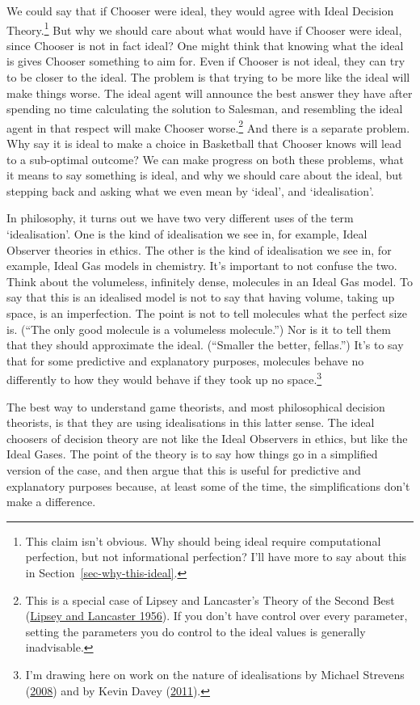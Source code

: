 \documentclass[
  12pt,
  letterpaper,
  DIV=11,
  numbers=noendperiod]{scrreprt}
\begin{document}
We could say that if Chooser were ideal, they would agree with Ideal
Decision Theory.\footnote{This claim isn't obvious. Why should being
  ideal require computational perfection, but not informational
  perfection? I'll have more to say about this in
  Section~\ref{sec-why-this-ideal}.} But why we should care about what
would have if Chooser were ideal, since Chooser is not in fact ideal?
One might think that knowing what the ideal is gives Chooser something
to aim for. Even if Chooser is not ideal, they can try to be closer to
the ideal. The problem is that trying to be more like the ideal will
make things worse. The ideal agent will announce the best answer they
have after spending no time calculating the solution to Salesman, and
resembling the ideal agent in that respect will make Chooser
worse.\footnote{This is a special case of Lipsey and Lancaster's Theory
  of the Second Best (\protect\hyperlink{ref-LipseyLancaster}{Lipsey and
  Lancaster 1956}). If you don't have control over every parameter,
  setting the parameters you do control to the ideal values is generally
  inadvisable.} And there is a separate problem. Why say it is ideal to
make a choice in Basketball that Chooser knows will lead to a
sub-optimal outcome? We can make progress on both these problems, what
it means to say something is ideal, and why we should care about the
ideal, but stepping back and asking what we even mean by `ideal', and
`idealisation'.

In philosophy, it turns out we have two very different uses of the term
`idealisation'. One is the kind of idealisation we see in, for example,
Ideal Observer theories in ethics. The other is the kind of idealisation
we see in, for example, Ideal Gas models in chemistry. It's important to
not confuse the two. Think about the volumeless, infinitely dense,
molecules in an Ideal Gas model. To say that this is an idealised model
is not to say that having volume, taking up space, is an imperfection.
The point is not to tell molecules what the perfect size is. (``The only
good molecule is a volumeless molecule.'') Nor is it to tell them that
they should approximate the ideal. (``Smaller the better, fellas.'')
It's to say that for some predictive and explanatory purposes, molecules
behave no differently to how they would behave if they took up no
space.\footnote{I'm drawing here on work on the nature of idealisations
  by Michael Strevens (\protect\hyperlink{ref-Strevens2008}{2008}) and
  by Kevin Davey (\protect\hyperlink{ref-Davey2011}{2011}).}

The best way to understand game theorists, and most philosophical
decision theorists, is that they are using idealisations in this latter
sense. The ideal choosers of decision theory are not like the Ideal
Observers in ethics, but like the Ideal Gases. The point of the theory
is to say how things go in a simplified version of the case, and then
argue that this is useful for predictive and explanatory purposes
because, at least some of the time, the simplifications don't make a
difference.
\end{document}
